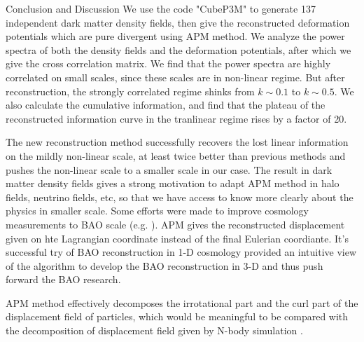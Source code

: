 \begin{section}{Conclusion and Discussion}
 \label{sec:conclusion}
    We use the code "CubeP3M" to generate 137 independent dark matter density fields, then give the reconstructed deformation potentials which are pure divergent using APM method. We analyze the power spectra of both the density fields and the deformation potentials, after which we give the cross correlation matrix. We find that the power spectra are highly correlated on small scales, since these scales are in non-linear regime. But after reconstruction, the strongly correlated regime shinks from $k\sim0.1$ to $k\sim0.5$. We also calculate the cumulative information, and find that the plateau of the reconstructed information curve in the tranlinear regime rises by a factor of 20.  

   The new reconstruction method successfully recovers the lost linear information on the mildly non-linear scale, at least twice better than previous methods \cite{bib:Mark2006,bib:Mark2009,bib:Zhang2011,bib:Yu2012,bib:Mark2014} and pushes the non-linear scale to a smaller scale in our case. The result in dark matter density fields gives a strong motivation to adapt APM method in halo fields, neutrino fields, etc, so that we have access to know more clearly about the physics in smaller scale. Some efforts were made to improve cosmology measurements to BAO scale (e.g. \cite{bib:Daniel2007,bib:Martin2015}). APM gives the reconstructed displacement given on hte Lagrangian coordinate instead of the final Eulerian coordiante. It's successful try of BAO reconstruction in 1-D cosmology \cite{bib:Zhu2016} provided an intuitive view of the algorithm to develop the BAO reconstruction in 3-D and thus push forward the BAO research.

   APM method effectively decomposes the irrotational part and the curl part of the displacement field of particles, which would be meaningful to be compared with the decomposition of displacement field given by N-body simulation \cite{bib:Yu2016}. 
\end{section}
